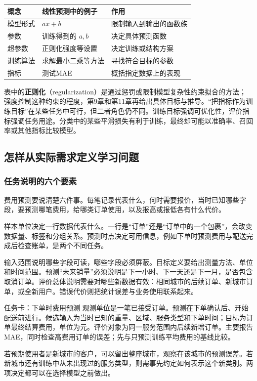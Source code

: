 \documentclass[UTF8,fontset=none,zihao=-4,a4paper]{ctexart}
\newcommand{\term}[1]{\textbf{#1}}
\numberwithin{equation}{section}
\numberwithin{figure}{section}
\begin{document}
\begin{center}
\begin{tabularx}{\linewidth}{l Y Y}
\toprule
概念 & 线性预测中的例子 & 作用\\\midrule
模型形式 & $ax+b$ & 限制输入到输出的函数族\\
参数 & 训练得到的 $a,b$ & 决定具体预测函数\\
超参数 & 正则化强度等设置 & 决定训练或结构方案\\
训练算法 & 求解最小二乘等方法 & 寻找符合目标的参数\\
指标 & 测试MAE & 概括指定数据上的表现\\
\bottomrule
\end{tabularx}
\end{center}
表中的\term{正则化}（regularization）是通过惩罚或限制模型复杂性约束拟合的方法；强度控制这种约束的程度，第9章和第11章再给出具体目标与推导。“把指标作为训练目标”在某些任务中可行，但二者角色仍不同。训练目标强调可优化性，评价指标强调任务用途。分类中的某些平滑损失有利于训练，最终却可能以准确率、召回率或其他指标比较模型。

\subsection{怎样从实际需求定义学习问题}
\subsubsection{任务说明的六个要素}
费用预测要说清楚六件事。每笔记录代表什么，何时需要报价，当时已知哪些字段，要预测哪笔费用，给哪类订单使用，以及报高或报低各有什么代价。

样本单位决定一行数据代表什么。一行是“订单”还是“订单中的一个包裹”，会改变数据量、标签和分组关系。预测时点决定可用信息，例如下单时预测费用与配送完成后检查账单，是两个不同任务。

输入范围说明哪些字段可读，哪些字段必须屏蔽。目标定义要给出测量方法、单位和时间范围。预测“未来销量”必须说明是下一小时、下一天还是下一月，是否包含取消订单。评价总体说明需要对哪些新数据有效：相同城市的后续订单、新城市订单，或全新用户。错误代价则把统计误差与业务使用联系起来。

\begin{infobox}{任务卡：下单时费用预测}
观测单位是一笔已接受订单。预测在下单确认后、开始配送前进行。候选输入为当时已知的重量、区域、服务类型和下单时间；目标为订单最终结算费用，单位为元。评价对象为同一服务范围内后续新增订单。主要报告MAE，同时检查高费用订单的误差；先与只预测训练平均费用的基线比较。
\end{infobox}
若预期使用者是新城市的客户，可以留出整座城市，观察在该城市的预测误差。若新城市还有训练中从未出现过的服务类型，则需事先约定如何表示这个新类别。两项决定都可以在选择模型之前做出。
\end{document}
